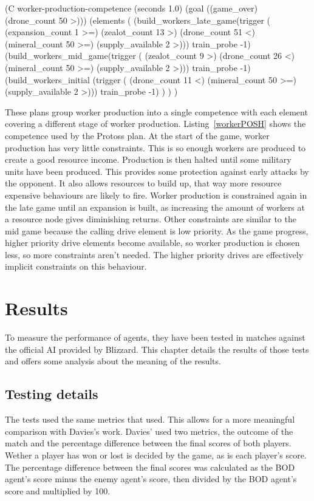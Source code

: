 \documentclass[11pt,openright,a4paper]{report}
\begin{document}
\begin{Code}[frame=single,language=Lisp,tabsize=4,breaklines,breakatwhitespace,caption={A competence to control the production of worker units at different stages of the game.},label=workerPOSH]
(C worker-production-competence (seconds 1.0) (goal ((game_over) (drone_count 50 >)))
	(elements
		(
			(build_workers_late_game(trigger (
										(expansion_count 1 >=)
                                        (zealot_count 13 >)
										(drone_count 51 <)
										(mineral_count 50 >=)
										(supply_available 2 >)))
				train_probe -1)
			(build_workers_mid_game(trigger (
										(zealot_count 9 >)
										(drone_count 26 <)
										(mineral_count 50 >=)
										(supply_available 2 >)))
				train_probe -1)
			(build_workers_initial (trigger (
										(drone_count 11 <)
										(mineral_count 50 >=)
										(supply_available 2 >)))
				train_probe -1)
		)
	)
)
\end{Code}

These plans group worker production into a single competence with each element covering a different stage of worker production. Listing~\ref{workerPOSH} shows the competence used by the Protoss plan. At the start of the game, worker production has very little constraints. This is so enough workers are produced to create a good resource income. Production is then halted until some military units have been produced. This provides some protection against early attacks by the opponent. It also allows resources to build up, that way more resource expensive behaviours are likely to fire. Worker production is constrained again in the late game until an expansion is built, as increasing the amount of workers at a resource node gives diminishing returns. Other constraints are similar to the mid game because the calling drive element is low priority. As the game progress, higher priority drive elements become available, so worker production is chosen less, so more constraints aren't needed. The higher priority drives are effectively implicit constraints on this behaviour.

\chapter{Results}
\label{Results}
To measure the performance of agents, they have been tested in matches against the official AI provided by Blizzard. This chapter details the results of those tests and offers some analysis about the meaning of the results.

\section{Testing details}
The tests used the same metrics that  used. This allows for a more meaningful comparison with Davies's work. Davies' used two metrics, the outcome of the match and the percentage difference between the final scores of both players. Wether a player has won or lost is decided by the game, as is each player's score. The percentage difference between the final scores was calculated as the BOD agent's score minus the enemy agent's score, then divided by the BOD agent's score and multiplied by 100.
\end{document}

